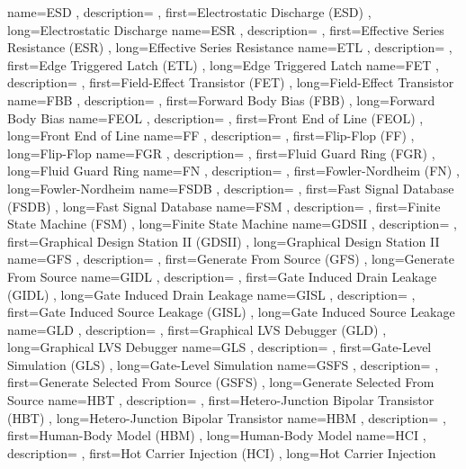 { name={ESD}
, description={}
, first={Electrostatic Discharge (ESD)}
, long={Electrostatic Discharge}
}
{ name={ESR}
, description={}
, first={Effective Series Resistance (ESR)}
, long={Effective Series Resistance}
}
{ name={ETL}
, description={}
, first={Edge Triggered Latch (ETL)}
, long={Edge Triggered Latch}
}
{ name={FET}
, description={}
, first={Field-Effect Transistor (FET)}
, long={Field-Effect Transistor}
}
{ name={FBB}
, description={}
, first={Forward Body Bias (FBB)}
, long={Forward Body Bias}
}
{ name={FEOL}
, description={}
, first={Front End of Line (FEOL)}
, long={Front End of Line}
}
{ name={FF}
, description={}
, first={Flip-Flop (FF)}
, long={Flip-Flop}
}
{ name={FGR}
, description={}
, first={Fluid Guard Ring (FGR)}
, long={Fluid Guard Ring}
}
{ name={FN}
, description={}
, first={Fowler-Nordheim (FN)}
, long={Fowler-Nordheim}
}
{ name={FSDB}
, description={}
, first={Fast Signal Database (FSDB)}
, long={Fast Signal Database}
}
{ name={FSM}
, description={}
, first={Finite State Machine (FSM)}
, long={Finite State Machine}
}
{ name={GDSII}
, description={}
, first={Graphical Design Station II (GDSII)}
, long={Graphical Design Station II}
}
{ name={GFS}
, description={}
, first={Generate From Source (GFS)}
, long={Generate From Source}
}
{ name={GIDL}
, description={}
, first={Gate Induced Drain Leakage (GIDL)}
, long={Gate Induced Drain Leakage}
}
{ name={GISL}
, description={}
, first={Gate Induced Source Leakage (GISL)}
, long={Gate Induced Source Leakage}
}
{ name={GLD}
, description={}
, first={Graphical LVS Debugger (GLD)}
, long={Graphical LVS Debugger}
}
{ name={GLS}
, description={}
, first={Gate-Level Simulation (GLS)}
, long={Gate-Level Simulation}
}
{ name={GSFS}
, description={}
, first={Generate Selected From Source (GSFS)}
, long={Generate Selected From Source}
}
{ name={HBT}
, description={}
, first={Hetero-Junction Bipolar Transistor (HBT)}
, long={Hetero-Junction Bipolar Transistor}
}
{ name={HBM}
, description={}
, first={Human-Body Model (HBM)}
, long={Human-Body Model}
}
{ name={HCI}
, description={}
, first={Hot Carrier Injection (HCI)}
, long={Hot Carrier Injection}
}
